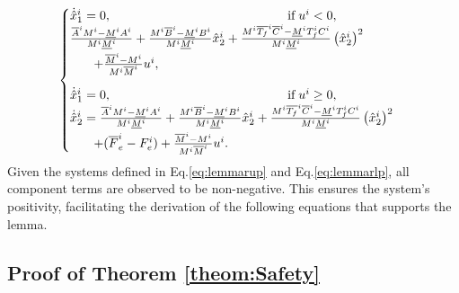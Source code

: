 \begin{equation}
	\label{eq:lemmarlp}
	\begin{cases}
		\dot{\hat{x}}_1^i =   0, \qquad  \qquad \qquad \qquad \qquad \qquad  \qquad  \text{if} \; u^i < 0,  \\
		\frac{ \overline{A}^i M^i - \underline{M}^i A^i}{M^i \underline{M}^i} + \frac{M^i \overline{B}^i - \underline{M}^i B^i}{M^i \underline{M}^i} \hat{x}_2^i + \frac{M^i  \overline{T_f}^i \overline{C}^i -  \underline{M}^i T_f^i C^i}{M^i \underline{M}^i}  \left(\hat{x}_2^i\right)^2 \\  
		\noalign{\vskip3pt} \quad \; \;\ + \frac{\overline{M}^i - M^i}{M^i \overline{M}^i}u^i, \\ 
		\noalign{\vskip9pt}
		\dot{\hat{x}}_1^i =   0, \qquad  \qquad \qquad \qquad \qquad \qquad  \qquad  \text{if} \; u^i \geq 0,  \\
		\dot{\hat{x}}_2^i = \frac{ \overline{A}^i M^i - \underline{M}^i A^i}{M^i \underline{M}^i} + \frac{M^i \overline{B}^i - \underline{M}^i B^i}{M^i \underline{M}^i} \hat{x}_2^i + \frac{M^i  \overline{T_f}^i \overline{C}^i -  \underline{M}^i T_f^i C^i}{M^i \underline{M}^i}  \left(\hat{x}_2^i\right)^2 \\  
		\noalign{\vskip3pt} \quad \; \;\ + (\overline{F}^i_e - {F}^i_e) + \frac{\overline{M}^i - M^i}{M^i \overline{M}^i}u^i. \\ 
	\end{cases}
\end{equation}
%
Given the systems defined in Eq.\eqref{eq:lemmarup} and Eq.\eqref{eq:lemmarlp}, all component terms are observed to be non-negative. This ensures the system's positivity, facilitating the derivation of the following equations that supports the lemma.

\subsection{Proof of Theorem \ref{theom:Safety}}
\label{appendix:Safety}

